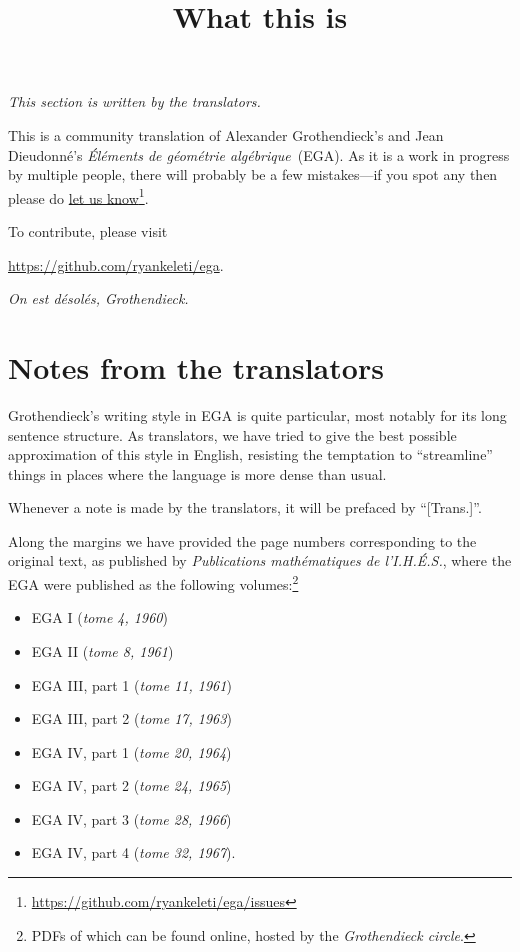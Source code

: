 


\title{What this is}
\maketitle

\label{section:phantom}

\noindent
\emph{This section is written by the translators.}

\noindent
This is a community translation of Alexander Grothendieck's and Jean Dieudonn\'e's \emph{\'El\'ements de g\'eom\'etrie alg\'ebrique}~(EGA).
As it is a work in progress by multiple people, there will probably be a few mistakes---if you spot any then please do \href{https://github.com/ryankeleti/ega/issues}{let us know}\footnote{\url{https://github.com/ryankeleti/ega/issues}}.

\noindent
To contribute, please visit
\begin{center}
  \url{https://github.com/ryankeleti/ega}.
\end{center}

\noindent
\emph{On est d\'esol\'es, Grothendieck.}

\section*{Notes from the translators}
Grothendieck's writing style in EGA is quite particular, most notably for its long sentence structure.
As translators, we have tried to give the best possible approximation of this style in English, resisting the temptation to ``streamline'' things in places where the language is more dense than usual.

\sectionbreak

Whenever a note is made by the translators, it will be prefaced by ``[Trans.]''.

\sectionbreak

Along the margins we have provided the page numbers corresponding to the original text, as published by \emph{Publications mathématiques de l'I.H.É.S.}, where the EGA were published as the following volumes:\footnote{PDFs of which can be found online, hosted by the \emph{Grothendieck circle}.}
\begin{itemize}
    \item EGA I (\emph{tome 4, 1960})
    \item EGA II (\emph{tome 8, 1961})
    \item EGA III, part 1 (\emph{tome 11, 1961})
    \item EGA III, part 2 (\emph{tome 17, 1963})
    \item EGA IV, part 1 (\emph{tome 20, 1964})
    \item EGA IV, part 2 (\emph{tome 24, 1965})
    \item EGA IV, part 3 (\emph{tome 28, 1966})
    \item EGA IV, part 4 (\emph{tome 32, 1967}).
\end{itemize}

